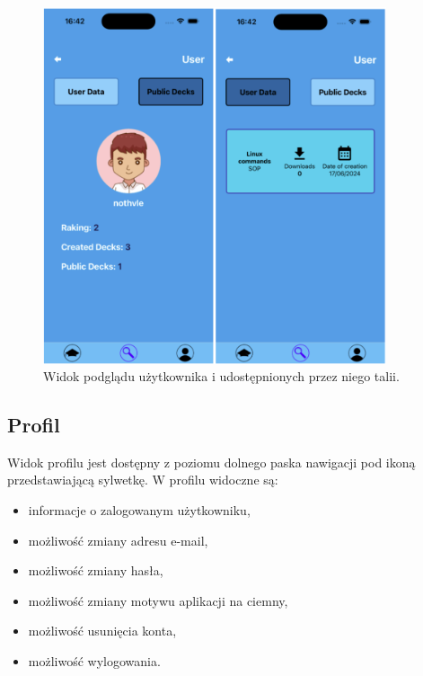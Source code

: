 \begin{figure}[H]
    \centering
    \includegraphics[width=0.9\textwidth]{chapters/chapter_10/images_mobile/mobile_other_user}
    \caption{Widok podglądu użytkownika i udostępnionych przez niego talii.}
    \label{img:mobile_other_user}
\end{figure}

\subsection{Profil}
Widok profilu jest dostępny z poziomu dolnego paska nawigacji pod ikoną przedstawiającą sylwetkę. W profilu widoczne są:
\begin{itemize}
    \item informacje o zalogowanym użytkowniku,
    \item możliwość zmiany adresu e-mail,
    \item możliwość zmiany hasła,
    \item możliwość zmiany motywu aplikacji na ciemny,
    \item możliwość usunięcia konta,
    \item możliwość wylogowania.
\end{itemize}